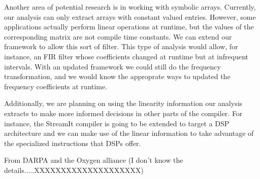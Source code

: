 Another area of potential research is in working with symbolic arrays. 
Currently, our analysis can only extract arrays with constant valued
entries. However, some applications actually perform linear operations
at runtime, but the values of the corresponding matrix are not compile
time constants. We can extend our framework to allow this sort of filter.
This type of analysis would allow, for instance, an FIR filter whose 
coefficients changed at runtime but at infrequent intervals. With an
updated framework we could still do the frequency transformation, and
we would know the approprate ways to updated the frequency coefficients
at runtime.

Additionally, we are planning on using the linearity information our
analysis extracts to make more informed decisions in other parts of the compiler.
For instance,  the StreamIt compiler is going to be extended to target 
a DSP architecture and we can make use of the linear information to 
take advantage of the specialized instructions that DSPs offer.


From DARPA and the Oxygen alliance (I don't know the details.....XXXXXXXXXXXXXXXXXXXX)
%
%
% 

